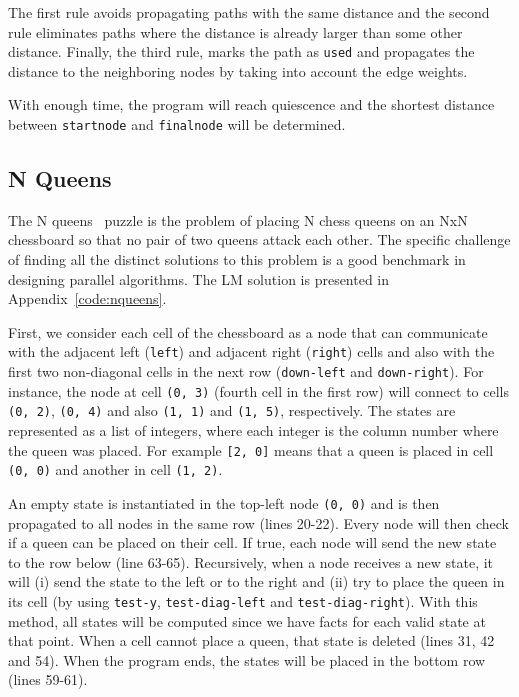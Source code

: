 The first rule avoids propagating paths with the same distance and the second rule eliminates paths where the distance
is already larger than some other distance. Finally, the third rule, marks the path as \texttt{used} and propagates
the distance to the neighboring nodes by taking into account the edge weights.

With enough time, the program will reach quiescence and the shortest distance between \texttt{startnode} and \texttt{finalnode}
will be determined.

\subsection{N Queens}

The N queens~\cite{8queens} puzzle is the problem of placing N chess queens on an NxN chessboard so
that no pair of two queens attack each other. The specific challenge of finding all the distinct
solutions to this problem is a good benchmark in designing parallel algorithms. The LM solution is presented
in Appendix~\ref{code:nqueens}.

First, we consider each cell of the chessboard as a node that can communicate with the adjacent left
(\texttt{left}) and adjacent right (\texttt{right}) cells and also with the first two non-diagonal cells in the next row
(\texttt{down-left} and \texttt{down-right}). For instance, the node at cell \texttt{(0,~3)} (fourth cell in the first row) will connect
to cells \texttt{(0,~2)}, \texttt{(0,~4)} and also \texttt{(1,~1)} and \texttt{(1,~5)}, respectively. The states are represented as a list
of integers, where each integer is the column number where the queen was placed. For example \texttt{[2, 0]}
means that a queen is placed in cell \texttt{(0,~0)} and another in cell \texttt{(1,~2)}.

An empty state is instantiated in the top-left node \texttt{(0,~0)} and is then propagated to all nodes in the same row (lines 20-22).
Every node will then check if a queen can be placed on their cell. If true, each node will send the new
state to the row below (line 63-65).
Recursively, when a node receives a new state, it will (i) send the state to the left
or to the right and (ii) try to place the queen in its cell (by using \texttt{test-y}, \texttt{test-diag-left} and \texttt{test-diag-right}). With this method,
all states will be computed since we have facts for each valid state
at that point. When a cell cannot place a queen, that state is deleted (lines 31, 42 and 54).
When the program ends, the states will be placed in the bottom row (lines 59-61).

